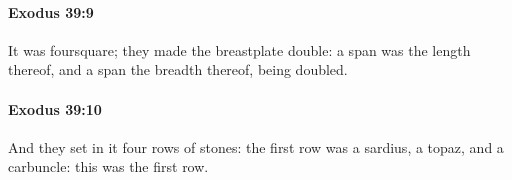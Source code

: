 		\paragraph{Exodus 39:9} %
			\label{EXODUS-39-9}

			It was foursquare; they made the breastplate double: a span was the length thereof, and a span the breadth thereof, being doubled.


		\paragraph{Exodus 39:10} %
			\label{EXODUS-39-10}

			And they set in it four rows of stones: the first row was a sardius, a topaz, and a carbuncle: this was the first row.



